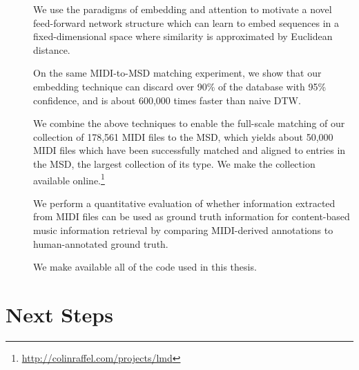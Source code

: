 \begin{description}
\item[] We use the paradigms of embedding and attention to motivate a novel feed-forward network structure which can learn to embed sequences in a fixed-dimensional space where similarity is approximated by Euclidean distance.

\item[] On the same MIDI-to-MSD matching experiment, we show that our embedding technique can discard over 90\% of the database with 95\% confidence, and is about 600,000 times faster than naive DTW.

\item[] We combine the above techniques to enable the full-scale matching of our collection of 178,561 MIDI files to the MSD, which yields about 50,000 MIDI files which have been successfully matched and aligned to entries in the MSD, the largest collection of its type.  We make the collection available online.\footnote{\url{http://colinraffel.com/projects/lmd}}

\item[] We perform a quantitative evaluation of whether information extracted from MIDI files can be used as ground truth information for content-based music information retrieval by comparing MIDI-derived annotations to human-annotated ground truth.

\item[] We make available all of the code used in this thesis.

\end{description}

\section{Next Steps}
\label{sec:ideas}

